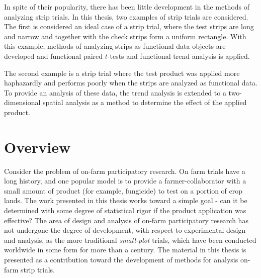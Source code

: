 \documentclass[phdcss]{SDSUThesis}
\begin{document}
In spite of their popularity, there has been little development in the methods of analyzing strip trials. In this thesis, two examples of strip trials are considered. The first is considered an ideal case of a strip trial, where the test strips are long and narrow and together with the check strips form a uniform rectangle. With this example, methods of analyzing strips as functional data objects are developed and functional paired $t$-tests and functional trend analysis is applied. 

The second example is a strip trial where the test product was applied more haphazardly and performs poorly when the strips are analyzed as functional data. To provide an analysis of these data, the trend analysis is extended to a two-dimensional spatial analysis as a method to determine the effect of the applied product.


\mainmatter



\clearpage
{} 












\chapter{Overview}\label{ChapOverview}

Consider the problem of on-farm participatory research. On farm trials have a long history, and one popular model is to provide a farmer-collaborator with a small amount of product (for example, fungicide) to test on a portion of crop lands. The work presented in this thesis works toward a simple goal - can it be determined with some degree of statistical rigor if the product application was effective? The area of design and analysis of on-farm participatory research has not undergone the degree of development, with respect to experimental design and analysis, as the more traditional \textit{small-plot} trials, which have been conducted worldwide in some form for more than a century. The material in this thesis is presented as a contribution toward the development of methods for analysis on-farm strip trials.
\end{document}

